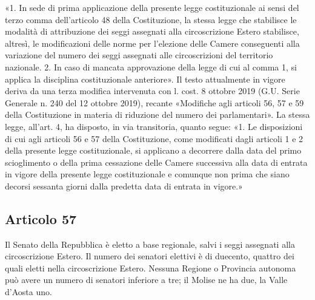 \documentclass{article}
\newcommand{\articolo}[1]{
	\subsection*{Articolo #1}
}
\begin{document}
{«1. In sede di prima applicazione della presente legge costituzionale ai sensi del terzo comma dell’articolo 48 della Costituzione, la stessa legge che stabilisce le modalità di attribuzione dei seggi assegnati alla circoscrizione Estero stabilisce, altresì, le modificazioni delle norme per l’elezione delle Camere conseguenti alla variazione del numero dei seggi assegnati alle circoscrizioni del territorio nazionale.
2. In caso di mancata approvazione della legge di cui al comma 1, si applica la disciplina costituzionale anteriore».
Il testo attualmente in vigore deriva da una terza modifica intervenuta con l. cost. 8 ottobre 2019 (G.U. Serie Generale n. 240 del 12 ottobre 2019), recante «Modifiche agli articoli 56, 57 e 59 della Costituzione in materia di riduzione del numero dei parlamentari».
La stessa legge, all'art. 4, ha disposto, in via transitoria, quanto segue:
«1. Le disposizioni di cui agli articoli 56 e 57 della Costituzione, come modificati dagli articoli 1 e 2 della presente legge costituzionale, si applicano a decorrere dalla data del primo scioglimento o della prima cessazione delle Camere successiva alla data di entrata in vigore della presente legge costituzionale e comunque non prima che siano decorsi sessanta giorni dalla predetta data di entrata in vigore.»}
\articolo{57}
Il Senato della Repubblica è eletto a base regionale, salvi i seggi assegnati alla circoscrizione Estero.
Il numero dei senatori elettivi è di duecento, quattro dei quali eletti nella circoscrizione Estero.
Nessuna Regione o Provincia autonoma può avere un numero di senatori inferiore a tre; il Molise ne ha due, la Valle d’Aosta uno.
\end{document}
